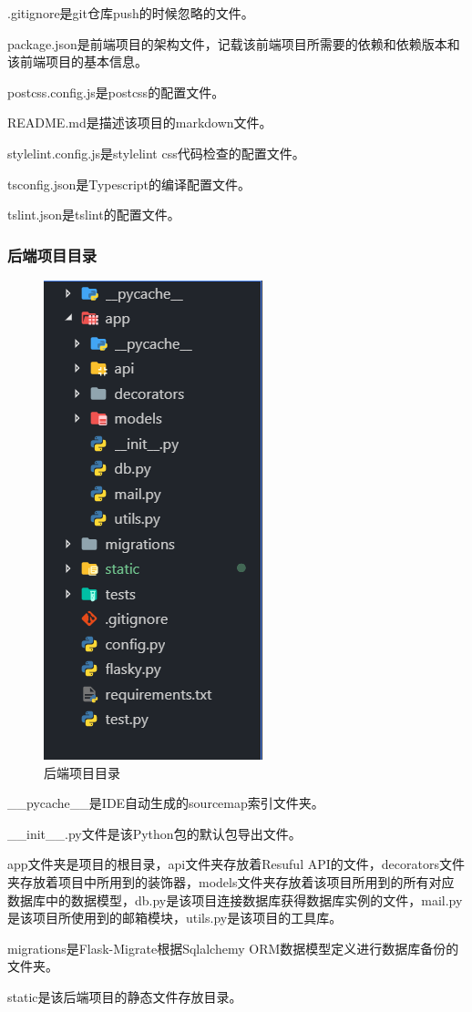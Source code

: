 .gitignore是git仓库push的时候忽略的文件。

package.json是前端项目的架构文件，记载该前端项目所需要的依赖和依赖版本和该前端项目的基本信息。

postcss.config.js是postcss的配置文件。

README.md是描述该项目的markdown文件。

stylelint.config.js是stylelint css代码检查的配置文件。

tsconfig.json是Typescript的编译配置文件。

tslint.json是tslint的配置文件。

\subsubsection{后端项目目录}
\begin{figure}[thbp!]
	\centering
	\includegraphics[width=0.3\linewidth]{figure/backend_structure}
	\caption{后端项目目录}
	\label{fig:backend_structure}
\end{figure}

\_\_pycache\_\_是IDE自动生成的sourcemap索引文件夹。

\_\_init\_\_.py文件是该Python包的默认包导出文件。

app文件夹是项目的根目录，api文件夹存放着Resuful API的文件，decorators文件夹存放着项目中所用到的装饰器，models文件夹存放着该项目所用到的所有对应数据库中的数据模型，db.py是该项目连接数据库获得数据库实例的文件，mail.py是该项目所使用到的邮箱模块，utils.py是该项目的工具库。

migrations是Flask-Migrate根据Sqlalchemy ORM数据模型定义进行数据库备份的文件夹。

static是该后端项目的静态文件存放目录。


